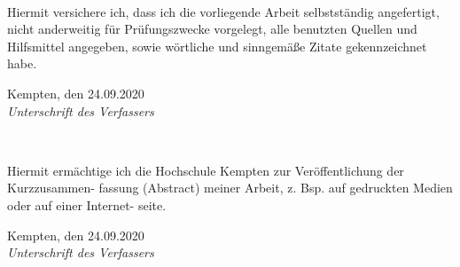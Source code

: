 \newpage
\thispagestyle{empty}


\\ 

\vspace*{2cm}

\noindent
Hiermit versichere ich, dass ich die vorliegende Arbeit selbstständig angefertigt, 
nicht anderweitig für Prüfungszwecke vorgelegt, alle benutzten
Quellen und Hilfsmittel angegeben, sowie wörtliche und sinngemäße Zitate gekennzeichnet habe.
\vspace{2cm}

\noindent
Kempten, den 24.09.2020
\hspace*{2cm}%
\dotfill\\
\hspace*{8.5cm}%
\textit{Unterschrift des Verfassers}

\vspace*{5cm}

\\ 

\vspace*{2cm}

\noindent
Hiermit ermächtige ich die Hochschule Kempten zur Veröffentlichung der Kurzzusammen-
fassung (Abstract) meiner Arbeit, z. Bsp. auf gedruckten Medien oder auf einer Internet-
seite.
\vspace{2cm}

\noindent
Kempten, den 24.09.2020
\hspace*{2cm}%
\dotfill\\
\hspace*{8.5cm}%
\textit{Unterschrift des Verfassers}
